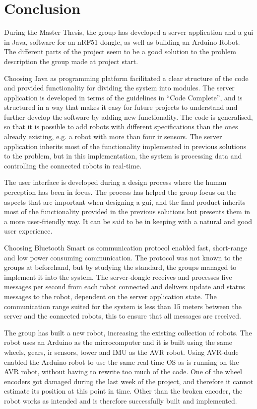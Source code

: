 \chapter*{\Huge Conclusion}
During the Master Thesis, the group has developed a server application and a \acrlong{gui} in Java, software for an nRF51-dongle, as well as building an Arduino Robot. The different parts of the project seem to be a good solution to the problem description the group made at project start.

Choosing Java as programming platform facilitated a clear structure of the code and provided functionality for dividing the system into modules. The server application is developed in terms of the guidelines in ``Code Complete'', and is structured in a way that makes it easy for future projects to understand and further develop the software by adding new functionality. The code is generalised, so that it is possible to add robots with different specifications than the ones already existing, e.g. a robot with more than four \acrlong{ir} sensors. The server application inherits most of the functionality implemented in previous solutions to the problem, but in this implementation, the system is processing data and controlling the connected robots in real-time. 

The user interface is developed during a design process where the human perception has been in focus. The process has helped the group focus on the aspects that are important when designing a \acrshort{gui}, and the final product inherits most of the functionality provided in the previous solutions but presents them in a more user-friendly way. It can be said to be in keeping with a natural and good user experience.

Choosing Bluetooth Smart as communication protocol enabled fast, short-range and low power consuming communication. The protocol was not known to the groups at beforehand, but by studying the standard, the groups managed to implement it into the system. The server-dongle receives and processes five messages per second from each robot connected and delivers update and status messages to the robot, dependent on the server application state. The communication range suited for the system is less than 15 meters between the server and the connected robots, this to ensure that all messages are received.

The group has built a new robot, increasing the existing collection of robots. The robot uses an Arduino as the microcomputer and it is built using the same wheels, gears, \acrshort{ir} sensors, tower and IMU as the AVR robot. Using AVR-dude enabled the Arduino robot to use the same real-time OS as is running on the AVR robot, without having to rewrite too much of the code. One of the wheel encoders got damaged during the last week of the project, and therefore it cannot estimate its position at this point in time. Other than the broken encoder, the robot works as intended and is therefore successfully built and implemented.

